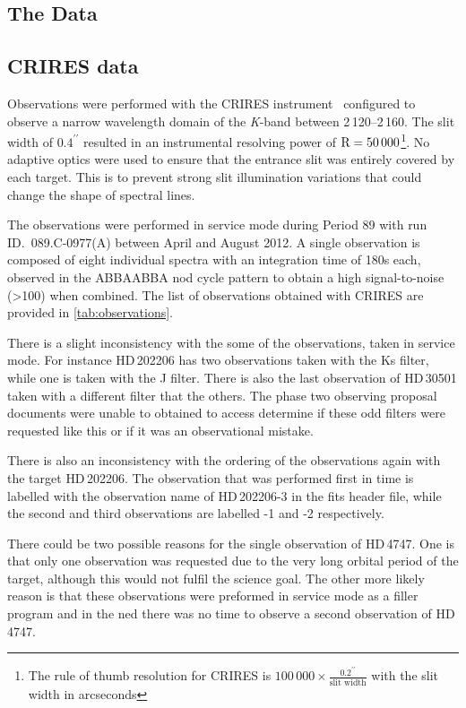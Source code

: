 


\subsection{The Data}

\subsection{CRIRES data}
\label{subsec:CRIRES}
Observations were performed with the {CRIRES} instrument~\citep{kaeufl_crires_2004} configured to observe a narrow wavelength domain of the \emph{K}-band between 2\,120--2\,160\nm{}.
The slit width of \(0.4^{\prime\prime}\) resulted in an instrumental resolving power of \(\textrm{R}=50\,000\)\footnote{The rule of thumb resolution for {CRIRES} is \(100\,000\times \frac{0.2^{\prime\prime}}{\textrm{slit width}}\) with the slit width in arcseconds}.
No adaptive optics were used to ensure that the entrance slit was entirely covered by each target.
This is to prevent strong slit illumination variations that could change the shape of spectral lines.

The observations were performed in service mode during Period 89 with run {ID.~089.C-0977(A)} between April and August 2012.
A single observation is composed of eight individual spectra with an integration time of 180\si{\second} each, observed in the {ABBAABBA} nod cycle pattern to obtain a high signal-to-noise (>100) when combined.
The list of observations obtained with {CRIRES} are provided in \cref{tab:observations}.

There is a slight inconsistency with the some of the observations, taken in service mode.
For instance {HD\,202206} has two observations taken with the {Ks} filter, while one is taken with the {J} filter.
There is also the last observation of {HD\,30501} taken with a different filter that the others.
The phase two observing proposal documents were unable to obtained to access determine if these odd filters were requested like this or if it was an observational mistake.

There is also an inconsistency with the ordering of the observations again with the target {HD\,202206}.
The observation that was performed first in time is labelled with the observation name of {HD\,202206-3} in the fits header file, while the second and third observations are labelled -1 and -2 respectively.

There could be two possible reasons for the single observation of {HD\,4747}.
One is that only one observation was requested due to the very long orbital period of the target, although this would not fulfil the science goal.
The other more likely reason is that these observations were preformed in service mode as a filler program and in the ned there was no time to observe a second observation of {HD\,4747}.

